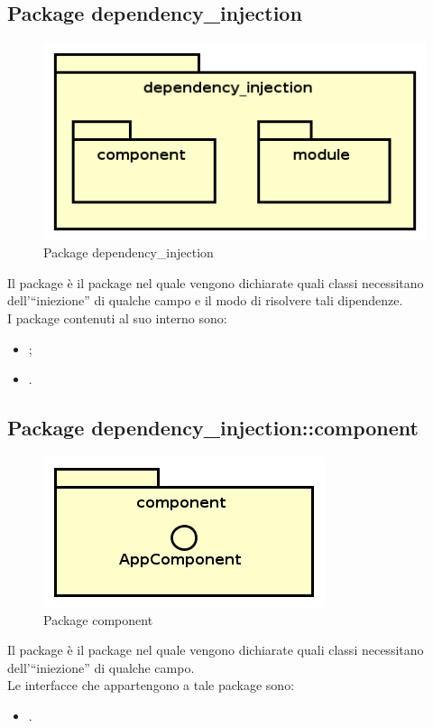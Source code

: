\documentclass[../Tesi.tex]{subfiles}
\begin{document}
	\subsection{Package dependency\_injection}
		\begin{figure}[H]
			\centering
			\includegraphics[scale=0.6]{images/package_diagrams/dependency_injection}
				\caption{Package dependency\_injection}
			\label{fig:StrutturaMVP}
		\end{figure}
		Il package  è il package nel quale vengono dichiarate quali classi necessitano dell'``iniezione'' di qualche campo e il modo di risolvere tali dipendenze. \\
		I package contenuti al suo interno sono:
		\begin{itemize}
			\item {};
			\item {}.
		\end{itemize}

	\subsection{Package dependency\_injection::component}
		\begin{figure}[H]
			\centering
			\includegraphics[scale=0.6]{images/package_diagrams/component}
				\caption{Package component}
			\label{fig:StrutturaMVP}
		\end{figure}
		Il package  è il package nel quale vengono dichiarate quali classi necessitano dell'``iniezione'' di qualche campo. \\
		Le interfacce che appartengono a tale package sono:
		\begin{itemize}
			\item {}.
		\end{itemize}	
\end{document}
